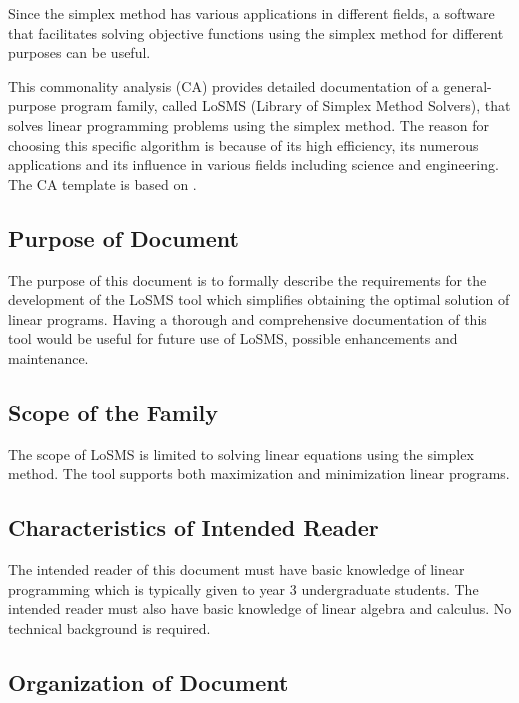 \documentclass[12pt]{article}
\newcommand{\famname}{LoSMS} %
\begin{document}
Since the simplex method has various applications in different fields, a 
software that facilitates solving objective functions using the simplex method 
for different purposes can be useful. 

This commonality analysis (CA) provides detailed documentation of a 
general-purpose program family, called \famname{} (Library of Simplex Method 
Solvers), that solves linear programming problems using the simplex method. The 
reason for choosing this specific algorithm is because of its high efficiency, 
its numerous applications and its influence in various fields including science 
and engineering. The CA template is based on \citet{Smith2006}.

\subsection{Purpose of Document}

The purpose of this document is to formally describe the requirements for the 
development of the \famname{} tool which simplifies obtaining the optimal 
solution of linear programs. Having a thorough and comprehensive documentation 
of this tool would be useful for future use of \famname{}, possible 
enhancements and maintenance.

\subsection{Scope of the Family} 

The scope of \famname{} is limited to solving linear equations using the 
simplex method. The tool supports both maximization and minimization linear 
programs.

\subsection{Characteristics of Intended Reader} 

The intended reader of this document must have basic knowledge of linear 
programming which is typically given to year 3 undergraduate students. The 
intended reader must also have basic knowledge of linear algebra and calculus. 
No technical background is required.

\subsection{Organization of Document}
\end{document}
